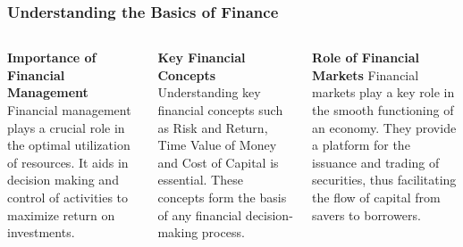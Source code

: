 \documentclass[5pt]{beamer}
\begin{document}
\begin{frame}
\frametitle{Understanding the Basics of Finance}
\begin{columns}
\begin{column}{0.3\textwidth}
\begin{block}{\textbf{Importance of Financial Management}}
Financial management plays a crucial role in the optimal utilization of resources. It aids in decision making and control of activities to maximize return on investments.
\end{block}
\end{column}
\begin{column}{0.3\textwidth}
\begin{block}{\textbf{Key Financial Concepts}}
Understanding key financial concepts such as Risk and Return, Time Value of Money and Cost of Capital is essential. These concepts form the basis of any financial decision-making process.
\end{block}
\end{column}
\begin{column}{0.3\textwidth}
\begin{block}{\textbf{Role of Financial Markets}}
Financial markets play a key role in the smooth functioning of an economy. They provide a platform for the issuance and trading of securities, thus facilitating the flow of capital from savers to borrowers.
\end{block}
\end{column}
\end{columns}
\end{frame}
\end{document}
